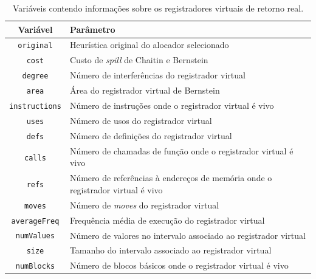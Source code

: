 \documentclass[
	12pt,				%
	openright,			%
	twoside,			%
	a4paper,			%
	tcc,			%
	]{ABNT-DC-UEL}
\begin{document}
\begin{table}[htb]
    \centering
    \begin{tabular}{cp{11cm}}
        \hline
        \textbf{Variável} & \textbf{Parâmetro} \\
        \hline \hline
        \texttt{original} & Heurística original do alocador selecionado \\
        \hline
        \texttt{cost} & Custo de \textit{spill} de Chaitin \cite{chaitin:82} e Bernstein \cite{bernstein:89} \\
        \hline
        \texttt{degree} & Número de interferências do registrador virtual \\
        \hline
        \texttt{area} & Área do registrador virtual de Bernstein \cite{bernstein:89} \\
        \hline
        \texttt{instructions} & Número de instruções onde o registrador virtual é vivo \\
        \hline
        \texttt{uses} & Número de usos do registrador virtual \\
        \hline
        \texttt{defs} & Número de definições do registrador virtual \\
        \hline
        \texttt{calls} & Número de chamadas de função onde o registrador virtual é vivo \\
        \hline
        \texttt{refs} & Número de referências à endereços de memória onde o registrador virtual é vivo \\
        \hline
        \texttt{moves} & Número de \textit{moves} do registrador virtual \\
        \hline
        \texttt{averageFreq} & Frequência média de execução do registrador virtual \\
        \hline
        \texttt{numValues} & Número de valores no intervalo associado ao registrador virtual \\
        \hline
        \texttt{size} & Tamanho do intervalo associado ao registrador virtual \\
        \hline
        \texttt{numBlocks} & Número de blocos básicos onde o registrador virtual é vivo \\
        \hline
    \end{tabular}
    \caption{Variáveis contendo informações sobre os registradores virtuais de retorno real.}
    \label{tab:terminais-reais}
\end{table}
\end{document}
